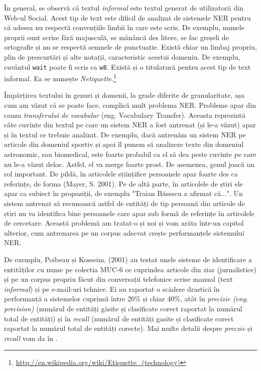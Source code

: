 În general, se observă că textul \textit{informal} este textul generat de utilizatorii din Web-ul Social. Acest tip de text este dificil de analizat de sistemele NER pentru că adesea nu respectă convențiile limbii în care este scris. De exemplu, numele proprii sunt scrise fără majusculă, se mănâncă des litere, se fac greșeli de ortografie și nu se respectă semnele de punctuație. Există chiar un limbaj propriu, plin de prescurtări și alte notații, caracteristic acestui domeniu. De exemplu, cuvântul \texttt{wait} poate fi scris ca \texttt{w8}. Există și o titulatură pentru acest tip de text informal. Ea se numește \textit{Netiquette}.\footnote{\url{http://en.wikipedia.org/wiki/Etiquette_(technology)}}

Împărțirea textului în genuri și domenii, la grade diferite de granularitate, așa cum am văzut că se poate face, complică mult problema NER. Probleme apar din cauza \textit{transferului de vocabular} (eng. Vocabulary Transfer). Aceasta reprezintă câte cuvinte din textul pe care un sistem NER a fost antrenat (și le-a văzut) apar și în textul ce trebuie analizat. De exemplu, dacă antrenăm un sistem NER pe articole din domeniul sportiv și apoi îl punem să analizeze texte din domeniul astronomic, sau biomedical, este foarte probabil ca el să dea peste cuvinte pe care nu le-a văzut deloc. Astfel, el va merge foarte prost. De asemenea, genul joacă un rol important. De pildă, în articolele sțiințifice persoanele apar foarte des ca referințe, de forma (Mayer, S. 2001). Pe de altă parte, în articolele de știri ele apar ca subiect în propoziții, de exemplu "Traian Băsescu a afirmat că...". Un sistem antrenat să recunoască astfel de entități de tip persoană din articole de știri nu va identifica bine persoanele care apar sub formă de referințe în articolele de cercetare. Această problemă am tratat-o și noi și vom arăta într-un capitol ulterior, cum antrenarea pe un corpus adecvat crește performanțele sistemului NER.


De exemplu, Poibeau și Kosseim, (2001) \cite{Poibeau01propername} au testat unele sisteme de identificare a entităților cu nume pe colectia MUC-6 ce cuprindea articole din ziar (jurnalistice) și pe un corpus propriu făcut din conversații telefonice scrise manual (text \textit{informal}) și pe e-mail-uri tehnice. Ei au raportat o scădere drastică în performanță a sistemelor cuprinsă între 20\% și chiar 40\%, atât în \textit{precizie (eng. precision)} (numărul de entități  găsite și clasificate corect raportat la numărul total de entități) și în \textit{recall} (numărul de entități gasite și clasificate corect raportat la numărul total de entități corecte). Mai multe detalii despre \textit{preczie} și \textit{recall} vom da în .


